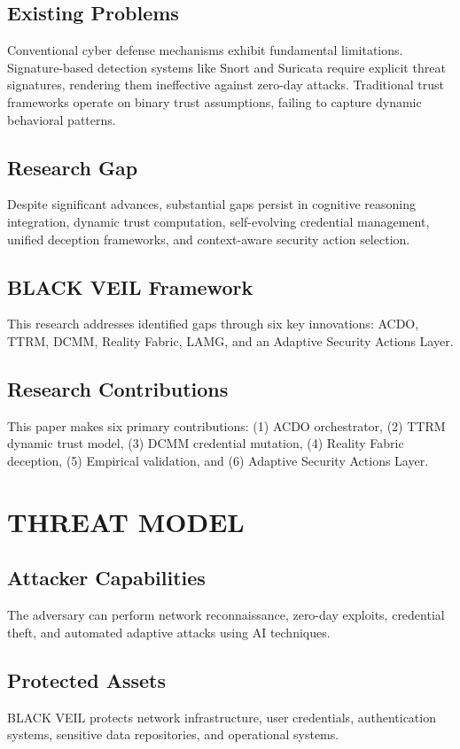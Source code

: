 \documentclass[10pt,journal,compsoc]{IEEEtran}
\begin{document}
\subsection{Existing Problems}
Conventional cyber defense mechanisms exhibit fundamental limitations. Signature-based detection systems like Snort and Suricata \cite{snort,suricata} require explicit threat signatures, rendering them ineffective against zero-day attacks. Traditional trust frameworks operate on binary trust assumptions, failing to capture dynamic behavioral patterns.

\subsection{Research Gap}
Despite significant advances, substantial gaps persist in cognitive reasoning integration, dynamic trust computation, self-evolving credential management, unified deception frameworks, and context-aware security action selection.

\subsection{BLACK VEIL Framework}
This research addresses identified gaps through six key innovations: ACDO, TTRM, DCMM, Reality Fabric, LAMG, and an Adaptive Security Actions Layer.

\subsection{Research Contributions}
This paper makes six primary contributions: (1) ACDO orchestrator, (2) TTRM dynamic trust model, (3) DCMM credential mutation, (4) Reality Fabric deception, (5) Empirical validation, and (6) Adaptive Security Actions Layer.

\section{THREAT MODEL}
\subsection{Attacker Capabilities}
The adversary can perform network reconnaissance, zero-day exploits, credential theft, and automated adaptive attacks using AI techniques.

\subsection{Protected Assets}
BLACK VEIL protects network infrastructure, user credentials, authentication systems, sensitive data repositories, and operational systems.
\end{document}
